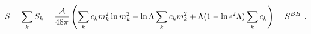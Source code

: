 \begin{equation}\label{3.5}
S=\sum_k S_k={{\cal A} \over 48\pi}\left(\sum_k c_km_k^2\ln m_k^2
-\ln \Lambda \sum_k c_k m_k^2
+ \Lambda(1-\ln\epsilon ^2 \Lambda )\sum_k c_k\right)=S^{BH}
~.
\end{equation}

